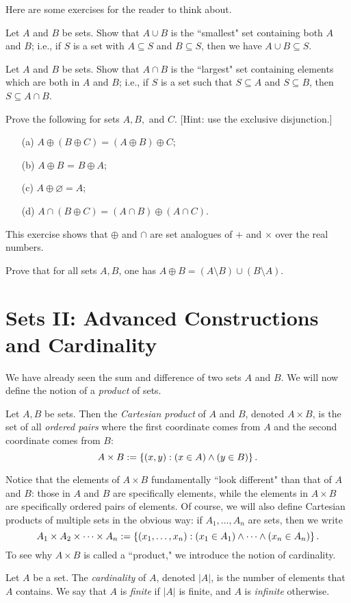 \documentclass{article}
\begin{document}
Here are some exercises for the reader to think about.
\begin{exercise}
Let $A$ and $B$ be sets. Show that $A\cup B$ is the ``smallest" set containing both $A$ and $B$; i.e., if $S$ is a set with $A\subseteq S$ and $B\subseteq S$, then we have $A\cup B\subseteq S$.
\end{exercise}
\begin{exercise}
Let $A$ and $B$ be sets. Show that $A\cap B$ is the ``largest" set containing elements which are both in $A$ and $B$; i.e., if $S$ is a set such that $S\subseteq A$ and $S\subseteq B$, then $S\subseteq A\cap B$.
\end{exercise}
\begin{exercise}
Prove the following for sets $A, B,$ and $C$. [Hint: use the exclusive disjunction.]
\begin{itemize}
    \item[(a)] $A\oplus (B\oplus C) = (A\oplus B)\oplus C$;
    \item[(b)] $A\oplus B$ = $B\oplus A$;
    \item[(c)] $A\oplus\varnothing = A$;
    \item[(d)] $A\cap (B\oplus C) = (A\cap B)\oplus (A\cap C)$.
\end{itemize}
This exercise shows that $\oplus$ and $\cap$ are set analogues of $+$ and $\times$ over the real numbers.
\end{exercise}
\begin{exercise}
Prove that for all sets $A,B$, one has $A\oplus B = (A\setminus B)\cup (B\setminus A)$.
\end{exercise}

\section{Sets II: Advanced Constructions and Cardinality}
We have already seen the sum and difference of two sets $A$ and $B$. We will now define the notion of a \textit{product} of sets.
\begin{definition}
Let $A,B$ be sets. Then the \textit{Cartesian product} of $A$ and $B$, denoted $A\times B$, is the set of all \textit{ordered pairs} where the first coordinate comes from $A$ and the second coordinate comes from $B$:
$$A\times B := \left\{(x,y): (x\in A)\land (y\in B)\right\}.$$
\end{definition}
Notice that the elements of $A\times B$ fundamentally ``look different" than that of $A$ and $B$: those in $A$ and $B$ are specifically elements, while the elements in $A\times B$ are specifically ordered pairs of elements. Of course, we will also define Cartesian products of multiple sets in the obvious way: if $A_1, \ldots, A_n$ are sets, then we write
$$A_1\times A_2\times\cdots\times A_n := \left\{(x_1, \ldots, x_n): (x_1\in A_1)\land \cdots\land (x_n\in A_n)\right\}.$$
To see why $A\times B$ is called a ``product," we introduce the notion of cardinality.  
\begin{definition}\label{cardinality}
Let $A$ be a set. The \textit{cardinality} of $A$, denoted $|A|$, is the number of elements that $A$ contains. We say that $A$ is \textit{finite} if $|A|$ is finite, and $A$ is \textit{infinite} otherwise.
\end{definition}
\end{document}

